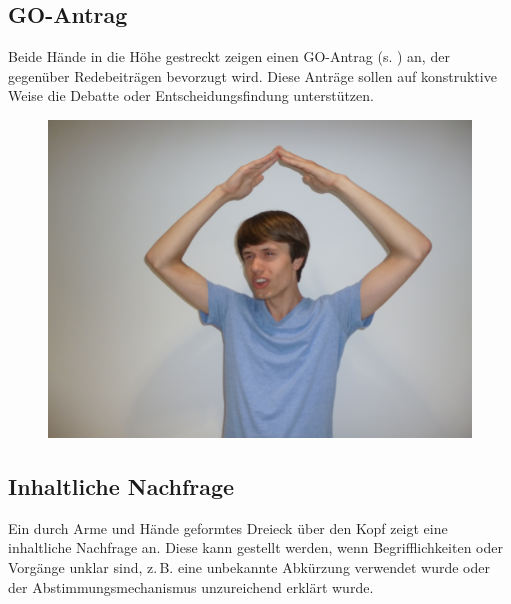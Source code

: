 \subsection*{GO-Antrag}
Beide Hände in die Höhe gestreckt zeigen einen GO-Antrag (s. ) an, der gegenüber Redebeiträgen bevorzugt wird. Diese Anträge sollen auf konstruktive Weise die Debatte oder Entscheidungsfindung unterstützen.

\begin{figure}
\includegraphics[width=\breite]{media/nachfrage}
\end{figure}

\subsection*{Inhaltliche Nachfrage}
Ein durch Arme und Hände geformtes Dreieck über den Kopf zeigt eine inhaltliche Nachfrage an. Diese kann gestellt werden, wenn Begrifflichkeiten oder Vorgänge unklar sind, z.\,B. eine unbekannte Abkürzung verwendet wurde oder der Abstimmungsmechanismus unzureichend erklärt wurde.